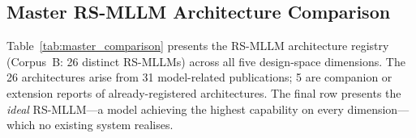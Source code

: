 \subsection{Master RS-MLLM Architecture Comparison}\label{sec3:master}

Table~\ref{tab:master_comparison} presents the RS-MLLM architecture registry
(Corpus~B: 26 distinct RS-MLLMs) across all five design-space dimensions.
The 26 architectures arise from 31 model-related publications;
5 are companion or extension reports of already-registered architectures.
The final row presents the \emph{ideal} RS-MLLM---a model achieving the highest capability
on every dimension---which no existing system realises.

